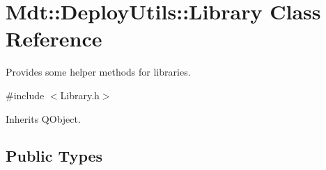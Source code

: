 \hypertarget{class_mdt_1_1_deploy_utils_1_1_library}{}\section{Mdt\+:\+:Deploy\+Utils\+:\+:Library Class Reference}
\label{class_mdt_1_1_deploy_utils_1_1_library}


Provides some helper methods for libraries.  




{\ttfamily \#include $<$Library.\+h$>$}



Inherits Q\+Object.

\subsection*{Public Types}
